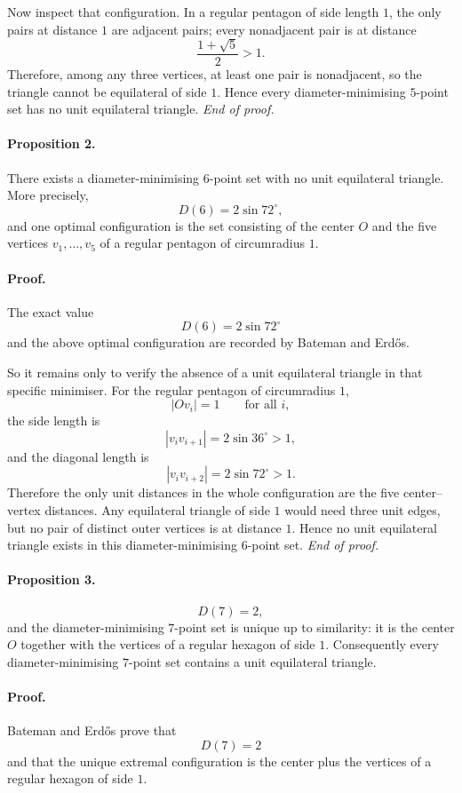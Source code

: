 Now inspect that configuration.
In a regular pentagon of side length $1$, the only pairs at distance $1$ are adjacent pairs; every nonadjacent pair is at distance
\[
\frac{1+\sqrt5}{2}>1.
\]
Therefore, among any three vertices, at least one pair is nonadjacent, so the triangle cannot be equilateral of side $1$.
Hence every diameter-minimising $5$-point set has no unit equilateral triangle. \hfill\emph{End of proof.}

\paragraph{Proposition 2.}
There exists a diameter-minimising $6$-point set with no unit equilateral triangle.
More precisely,
\[
D(6)=2\sin 72^\circ,
\]
and one optimal configuration is the set consisting of the center $O$ and the five vertices $v_1,\dots,v_5$ of a regular pentagon of circumradius $1$.

\paragraph{Proof.}
The exact value
\[
D(6)=2\sin 72^\circ
\]
and the above optimal configuration are recorded by Bateman and Erd\H{o}s.

So it remains only to verify the absence of a unit equilateral triangle in that specific minimiser.
For the regular pentagon of circumradius $1$,
\[
|Ov_i|=1
\qquad\text{for all }i,
\]
the side length is
\[
|v_i v_{i+1}|=2\sin 36^\circ>1,
\]
and the diagonal length is
\[
|v_i v_{i+2}|=2\sin 72^\circ>1.
\]
Therefore the only unit distances in the whole configuration are the five center--vertex distances.
Any equilateral triangle of side $1$ would need three unit edges, but no pair of distinct outer vertices is at distance $1$.
Hence no unit equilateral triangle exists in this diameter-minimising $6$-point set. \hfill\emph{End of proof.}

\paragraph{Proposition 3.}
\[
D(7)=2,
\]
and the diameter-minimising $7$-point set is unique up to similarity: it is the center $O$ together with the vertices of a regular hexagon of side $1$.
Consequently every diameter-minimising $7$-point set contains a unit equilateral triangle.

\paragraph{Proof.}
Bateman and Erd\H{o}s prove that
\[
D(7)=2
\]
and that the unique extremal configuration is the center plus the vertices of a regular hexagon of side $1$.

